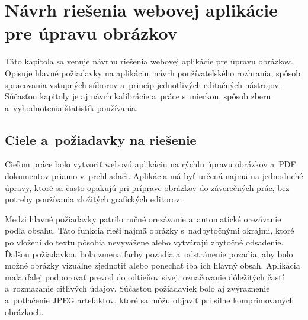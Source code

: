 \chapter{Návrh riešenia webovej aplikácie pre úpravu obrázkov}
\label{chap_navrh}
Táto kapitola sa venuje návrhu riešenia webovej aplikácie pre úpravu obrázkov. Opisuje hlavné požiadavky na aplikáciu, návrh používateľského rozhrania, spôsob spracovania vstupných súborov a~princíp jednotlivých editačných nástrojov. Súčasťou kapitoly je aj návrh kalibrácie a~práce s~mierkou, spôsob zberu a~vyhodnotenia štatistík používania.

\section{Ciele a~požiadavky na riešenie}

Cieľom práce bolo vytvoriť webovú aplikáciu na rýchlu úpravu obrázkov a~PDF dokumentov priamo v~prehliadači. Aplikácia má byť určená najmä na jednoduché úpravy, ktoré sa často opakujú pri príprave obrázkov do záverečných prác, bez potreby používania zložitých grafických editorov.

Medzi hlavné požiadavky patrilo ručné orezávanie a~automatické orezávanie podľa obsahu. Táto funkcia rieši najmä obrázky s~nadbytočnými okrajmi, ktoré po vložení do textu pôsobia nevyvážene alebo vytvárajú zbytočné odsadenie. Ďalšou požiadavkou bola zmena farby pozadia a~odstránenie pozadia, aby bolo možné obrázky vizuálne zjednotiť alebo ponechať iba ich hlavný obsah. Aplikácia mala ďalej podporovať prevod do odtieňov sivej, označovanie dôležitých častí a~rozmazanie citlivých údajov. Súčasťou požiadaviek bolo aj zvýraznenie a~potlačenie JPEG artefaktov, ktoré sa môžu objaviť pri silne komprimovaných obrázkoch. 

